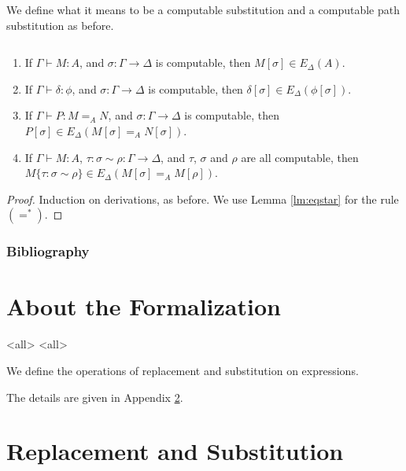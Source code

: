 We define what it means to be a computable substitution and a computable path substitution as before.

\begin{theorem}
$ $
\begin{enumerate}
\item
If $\Gamma \vdash M : A$, and $\sigma : \Gamma \rightarrow \Delta$ is computable,
then $M [ \sigma ] \in E_\Delta(A)$.
\item
If $\Gamma \vdash \delta : \phi$, and $\sigma : \Gamma \rightarrow \Delta$ is computable,
then $\delta [ \sigma ] \in E_\Delta(\phi[\sigma])$.
\item
If $\Gamma \vdash P : M =_A N$, and $\sigma : \Gamma \rightarrow \Delta$ is computable,
then $P [ \sigma ] \in E_\Delta(M [ \sigma ] =_A N [ \sigma ])$.
\item
If $\Gamma \vdash M : A$, $\tau : \sigma \sim \rho : \Gamma \rightarrow \Delta$, and $\tau$, $\sigma$
and $\rho$ are all computable, then $M \{ \tau : \sigma \sim \rho \} \in E_\Delta(M [ \sigma ] =_A M [ \rho ])$.
\end{enumerate}
\end{theorem}

\begin{proof}
Induction on derivations, as before.  We use Lemma \ref{lm:eqstar} for the rule
$(=^*)$.
\end{proof}

\todos

\begin{frame}
\frametitle{Bibliography}

\end{frame}

\appendix

\section{About the Formalization}


\mode<all>{}
\mode<all>{}

We define the operations of replacement and substitution on
expressions.  




The details are given in Appendix \ref{appendix:repsub}.




%
%
%

\section{Replacement and Substitution}
\label{appendix:repsub}













